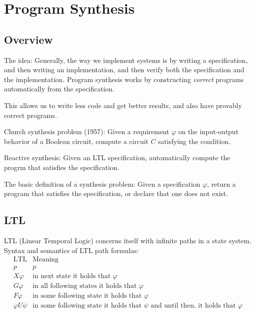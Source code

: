 \section{Program Synthesis}
\subsection{Overview}

The idea: Generally, the way we implement systems is by writing a specification, and then
writing an implementation, and then verify both the specification and the implementation.
Program synthesis works by constructing \emph{correct} programs automatically
from the specification.

This allows us to write less code and get better results, and also have provably
correct programs.

Church synthesis problem (1957): Given a requirement $\varphi$ on the
input-output behavior of a Boolean circuit, compute a circuit $C$
satisfying the condition.

Reactive synthesis: Given an LTL specification, automatically compute the progrm
that satisfies the specification.

The basic definition of a synthesis problem: Given a specification $\varphi$,
return a program that satisfies the specification, or declare that one does not exist.

\subsection{LTL}

LTL (Linear Temporal Logic) concerns itself with infinite paths in a state system. 
Syntax and semantics of LTL path formulas:
\[
\begin{array}{cc}
\text{LTL}&\text{Meaning} \\
p & p \\
X \varphi & \text{in next state it holds that~} \varphi \\
G \varphi & \text{in all following states it holds that~} \varphi \\
F \varphi & \text{in some following state it holds that~} \varphi \\
\varphi U \psi & \text{in some following state it holds that~} \psi \text{~and until then, it holds that~} \varphi
\end{array}
\]

